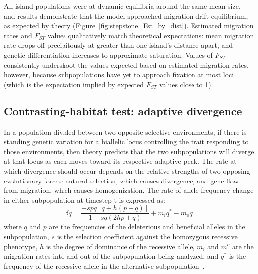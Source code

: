 ﻿\documentclass{article}
\begin{document}
All island populations were at dynamic equilibria around the same mean size,
and results demonstrate that the model approached migration-drift equilibrium,
as expected by theory (Figure~\ref{fig:stepstone_Fst_by_dist}).
Estimated migration rates and $F_{ST}$ values qualitatively match theoretical expectations:
mean migration rate drops off precipitously at greater than one island's distance apart, 
and genetic differentiation increases to approximate saturation.
Values of $F_{ST}$ consistently undershoot the values expected based on estimated
migration rates, however, because subpopulations have yet to approach fixation
at most loci (which is the expectation implied by expected $F_{ST}$ values
close to 1).


\subsection{Contrasting-habitat test: adaptive divergence}
In a population divided between two opposite selective environments, if there is
standing genetic variation for a biallelic locus controlling the trait responding
to those environments, then theory predicts that the two subpopulations will diverge at
that locus as each moves toward its respective adaptive peak.
The rate at which divergence should occur depends on the relative strengths
of two opposing evolutionary forces: natural selection, which causes divergence,
and gene flow from migration, which causes homogenization. 
The rate of allele frequency change
in either subpopulation at timestep t is expressed as:
\begin{equation}
        \delta{q} = \frac{-spq[q + h(p - q)]}{1 - sq(2hp + q)} + m_{i}q^{*} - m_{o}q
\label{eqxn:rate_allele_freq_change}
\end{equation}
where $q$ and $p$ are the frequencies of the deleterious and beneficial alleles
in the subpopulation, $s$ is the selection
coefficient against the homozygous recessive phenotype, $h$ is the degree of dominance
of the recessive allele, $m_{i}$ and $m^{o}$ are the migration rates into and out of
the subpopulation being analyzed, and $q^{*}$ is the frequency of the recessive allele
in the alternative subpopulation~\cite{hartl}.
\end{document}
